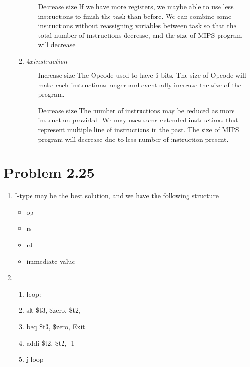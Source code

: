 \documentclass{article}
\def\math#1{$#1$}
\begin{document}
\begin{enumerate}[1)]
\begin{enumerate}
\begin{itemize}
                \item [Decrease size] If we have more registers, we maybe able to use less instructions to finish the task than before. We can combine some instructions without reassigning variables between task so that the total number of instructions decrease, and the size of MIPS program will decrease
                \end{itemize}
        \item \math{4x instruction}
            \begin{itemize}
                \item [Increase size] The Opcode used to have 6 bits. The size of Opcode will make each instructions longer and eventually increase the size of the program.
                \item [Decrease size] The number of instructions may be reduced as more instruction provided. We may uses some extended instructions that represent multiple line of instructions in the past. The size of MIPS program will decrease due to less number of instruction present.
            \end{itemize}
    \end{enumerate}
\end{enumerate}

\section{Problem 2.25}
\begin{enumerate}[1)]
    \item I-type may be the best solution, and we have the following structure 
        \begin{itemize}
            \item op
            \item rs
            \item rd
            \item immediate value
        \end{itemize}
    \item \begin{enumerate}[1/]
        \item loop:
        \item slt \$t3, \$zero, \$t2, 
        \item beq \$t3, \$zero, Exit
        \item addi \$t2, \$t2, -1
        \item j loop
    \end{enumerate}
\end{enumerate}
\end{document}
